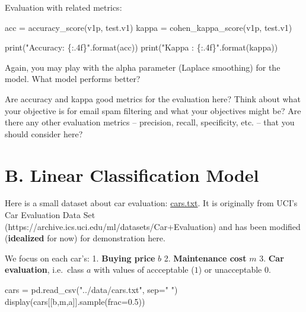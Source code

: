 \documentclass[
  letterpaper,
]{scrbook}
\newenvironment{Shaded}{\begin{snugshade}}{\end{snugshade}}
\newcommand{\BuiltInTok}[1]{\textcolor[rgb]{0.00,0.23,0.31}{#1}}
\newcommand{\FloatTok}[1]{\textcolor[rgb]{0.68,0.00,0.00}{#1}}
\newcommand{\NormalTok}[1]{\textcolor[rgb]{0.00,0.23,0.31}{#1}}
\newcommand{\OperatorTok}[1]{\textcolor[rgb]{0.37,0.37,0.37}{#1}}
\newcommand{\SpecialCharTok}[1]{\textcolor[rgb]{0.37,0.37,0.37}{#1}}
\newcommand{\StringTok}[1]{\textcolor[rgb]{0.13,0.47,0.30}{#1}}
\begin{document}
Evaluation with related metrics:

\begin{Shaded}
\begin{Highlighting}[]
\NormalTok{acc }\OperatorTok{=}\NormalTok{ accuracy\_score(v1p, test.v1)}
\NormalTok{kappa }\OperatorTok{=}\NormalTok{ cohen\_kappa\_score(v1p, test.v1)}

\BuiltInTok{print}\NormalTok{(}\StringTok{"Accuracy: }\SpecialCharTok{\{:.4f\}}\StringTok{"}\NormalTok{.}\BuiltInTok{format}\NormalTok{(acc))}
\BuiltInTok{print}\NormalTok{(}\StringTok{"Kappa   : }\SpecialCharTok{\{:.4f\}}\StringTok{"}\NormalTok{.}\BuiltInTok{format}\NormalTok{(kappa))}
\end{Highlighting}
\end{Shaded}

Again, you may play with the alpha parameter (Laplace smoothing) for the
model. What model performs better?

Are accuracy and kappa good metrics for the evaluation here? Think about
what your objective is for email spam filtering and what your objectives
might be? Are there any other evaluation metrics -- precision, recall,
specificity, etc. -- that you should consider here?

\section*{B. Linear Classification
Model}\label{b.-linear-classification-model}


Here is a small dataset about car evaluation:
\href{../data/cars.txt}{cars.txt}. It is originally from UCI's Car
Evaluation Data Set
(https://archive.ics.uci.edu/ml/datasets/Car+Evaluation) and has been
modified (\textbf{idealized} for now) for demonstration here.

We focus on each car's: 1. \textbf{Buying price} \(b\) 2.
\textbf{Maintenance cost} \(m\) 3. \textbf{Car evaluation}, i.e.~class
\(a\) with values of accceptable (\(1\)) or unacceptable \(0\).

\begin{Shaded}
\begin{Highlighting}[]
\NormalTok{cars }\OperatorTok{=}\NormalTok{ pd.read\_csv(}\StringTok{"../data/cars.txt"}\NormalTok{, sep}\OperatorTok{=}\StringTok{" "}\NormalTok{)}
\NormalTok{display(cars[[}\StringTok{\textquotesingle{}b\textquotesingle{}}\NormalTok{,}\StringTok{\textquotesingle{}m\textquotesingle{}}\NormalTok{,}\StringTok{\textquotesingle{}a\textquotesingle{}}\NormalTok{]].sample(frac}\OperatorTok{=}\FloatTok{0.5}\NormalTok{))}
\end{Highlighting}
\end{Shaded}
\end{document}
